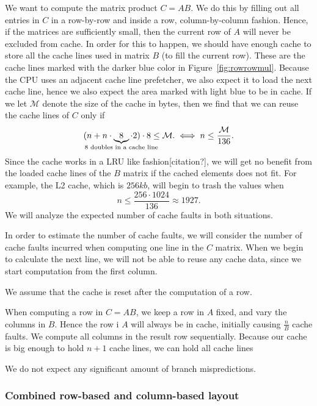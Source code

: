 We want to compute the matrix product $C = AB$. We do this by filling
out all entries in $C$ in a row-by-row and inside a row,
column-by-column fashion. Hence, if the matrices are sufficiently
small, then the current row of $A$ will never be excluded from
cache. In order for this to happen, we should have enough cache to
store all the cache lines used in matrix $B$ (to fill the current
row). These are the cache lines marked with the darker blue color in
Figure~\ref{fig:rowrowmul}. Because the CPU uses an adjacent cache
line prefetcher, we also expect it to load the next cache line, hence
we also expect the area marked with light blue to be in cache. If we
let $\mathcal{M}$ denote the size of the cache in bytes, then we find
that we can reuse the cache lines of $C$ only if
\[
( n + n \cdot \underbrace{8}_{\mathclap{8 \text{ doubles in a cache line}}} \cdot 2) \cdot 8 \leq \mathcal{M}.
\iff
n \leq \frac{\mathcal{M}}{136}.
\]
Since the cache works in a LRU like fashion[citation?], we will get no
benefit from the loaded cache lines of the $B$ matrix if the cached
elements does not fit. For example, the L2 cache, which is $256kb$,
will begin to trash the values when
\[
n \leq \frac{256 \cdot 1024}{136} \approx 1927.
\]
We will analyze the expected number of cache faults in both situations.

In order to estimate the number of cache faults, we will consider the
number of cache faults incurred when computing one line in the $C$
matrix. When we begin to calculate the next line, we will not be able
to reuse any cache data, since we start computation from the first
column.



 We assume that the cache is reset
after the computation of a row.


When computing a row in $C = AB$, we keep a row in $A$ fixed, and vary
the columns in $B$. Hence the row i $A$ will always be in cache,
initially causing $\frac{n}{B}$ cache faults. We compute all columns
in the result row sequentially. Because our cache is big enough to
hold $n+1$ cache lines, we can hold all cache lines



We do not expect any significant amount of branch mispredictions.

\subsubsection{Combined row-based and column-based layout}

